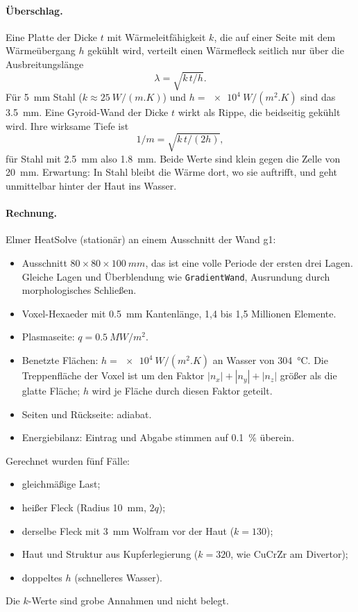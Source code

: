 \documentclass[10pt,a4paper]{article}
\begin{document}
\paragraph{Überschlag.} Eine Platte der Dicke $t$ mit Wärmeleitfähigkeit $k$, die auf einer Seite mit dem
Wärmeübergang $h$ gekühlt wird, verteilt einen Wärmefleck seitlich nur über die Ausbreitungslänge
\begin{equation}\lambda=\sqrt{k\,t/h}.\end{equation}
Für \SI{5}{mm} Stahl ($k\approx\SI{25}{W/(m.K)}$) und $h=\SI{e4}{W/(m^2.K)}$ sind das \SI{3,5}{mm}.
Eine Gyroid-Wand der Dicke $t$ wirkt als Rippe, die beidseitig gekühlt wird. Ihre wirksame Tiefe ist
\begin{equation}1/m=\sqrt{k\,t/(2h)},\end{equation}
für Stahl mit \SI{2,5}{mm} also \SI{1,8}{mm}. Beide Werte sind klein gegen die Zelle von \SI{20}{mm}.
Erwartung: In Stahl bleibt die Wärme dort, wo sie auftrifft, und geht unmittelbar hinter der Haut ins Wasser.

\paragraph{Rechnung.} Elmer HeatSolve (stationär) an einem Ausschnitt der Wand g1:
\begin{itemize}
\item Ausschnitt $80\times80\times\SI{100}{mm}$, das ist eine volle Periode der ersten drei Lagen. Gleiche Lagen und Überblendung wie \texttt{GradientWand}, Ausrundung durch morphologisches Schließen.
\item Voxel-Hexaeder mit \SI{0,5}{mm} Kantenlänge, 1,4 bis 1,5 Millionen Elemente.
\item Plasmaseite: $q=\SI{0,5}{MW/m^2}$.
\item Benetzte Flächen: $h=\SI{e4}{W/(m^2.K)}$ an Wasser von \SI{304}{\celsius}. Die Treppenfläche der Voxel ist um den Faktor $|n_x|+|n_y|+|n_z|$ größer als die glatte Fläche; $h$ wird je Fläche durch diesen Faktor geteilt.
\item Seiten und Rückseite: adiabat.
\item Energiebilanz: Eintrag und Abgabe stimmen auf \SI{0,1}{\%} überein.
\end{itemize}
Gerechnet wurden fünf Fälle:
\begin{itemize}
\item gleichmäßige Last;
\item heißer Fleck (Radius \SI{10}{mm}, $2q$);
\item derselbe Fleck mit \SI{3}{mm} Wolfram vor der Haut ($k=130$);
\item Haut und Struktur aus Kupferlegierung ($k=320$, wie CuCrZr am Divertor);
\item doppeltes $h$ (schnelleres Wasser).
\end{itemize}
Die $k$-Werte sind grobe Annahmen und nicht belegt.
\end{document}
